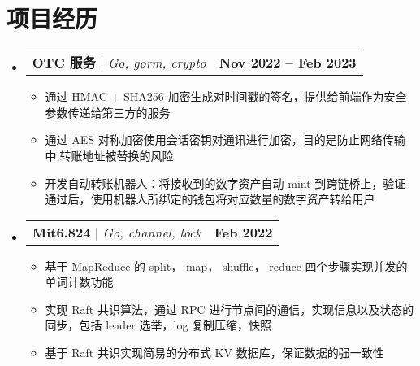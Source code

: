 \documentclass[letterpaper,11pt]{ctexart}
\makeatletter
\newcommand{\resumeItem}[1]{
  \item\small{
    {#1 \vspace{-2pt}}
  }
}
\newcommand{\resumeProjectHeading}[2]{
    \item
    \begin{tabular*}{1.001\textwidth}{l@{\extracolsep{\fill}}r}
      \small#1 & \textbf{\small #2}\\
    \end{tabular*}\vspace{-7pt}
}
\newcommand{\resumeSubHeadingListStart}{\begin{itemize}[leftmargin=0.0in, label={}]}
\newcommand{\resumeSubHeadingListEnd}{\end{itemize}}
\newcommand{\resumeItemListStart}{\begin{itemize}}
\newcommand{\resumeItemListEnd}{\end{itemize}\vspace{-5pt}}
\makeatother
\begin{document}
\section{项目经历}
    \vspace{-5pt}
    \resumeSubHeadingListStart

          \resumeProjectHeading
          {\textbf{OTC 服务} $|$ \emph{Go, gorm, crypto}}{Nov 2022 -- Feb 2023}
          \resumeItemListStart
            \resumeItem{通过 HMAC + SHA256 加密生成对时间戳的签名，提供给前端作为安全参数传递给第三方的服务}
            \resumeItem{通过 AES 对称加密使用会话密钥对通讯进行加密，目的是防止网络传输中,转账地址被替换的风险}
            \resumeItem{开发自动转账机器人：将接收到的数字资产自动 mint 到跨链桥上，验证通过后，使用机器人所绑定的钱包将对应数量的数字资产转给用户}
          \resumeItemListEnd
          \vspace{-20pt}

          \resumeProjectHeading
          {\textbf{Mit6.824} $|$ \emph{Go, channel, lock}}{Feb 2022}
          \resumeItemListStart
            \resumeItem{基于 MapReduce 的 split， map， shuffle， reduce 四个步骤实现并发的单词计数功能}
            \resumeItem{实现 Raft 共识算法，通过 RPC 进行节点间的通信，实现信息以及状态的同步，包括 leader 选举，log 复制压缩，快照}
            \resumeItem{基于 Raft 共识实现简易的分布式 KV 数据库，保证数据的强一致性}
          \resumeItemListEnd 
    \resumeSubHeadingListEnd
\vspace{-15pt}
\end{document}
